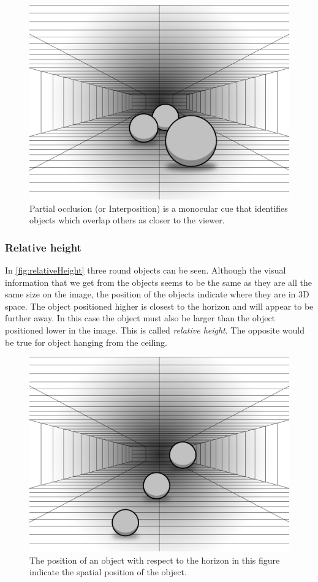 \begin{figure}[H]
	\centering
	\includegraphics[width=0.75\linewidth]{figure/Analysis/partialOcclusion.png}
	\caption{Partial occlusion (or Interposition) is a monocular cue that identifies objects which overlap others as closer to the viewer.}
	\label{fig:partialOcclusion}
\end{figure}

\subsubsection{Relative height}\label{sec:relativeHeight}
In \autoref{fig:relativeHeight} three round objects can be seen. Although the visual information that we get from the objects seems to be the same as they are all the same size on the image, the position of the objects indicate where they are in 3D space. The object positioned higher is closest to the horizon and will appear to be further away. In this case the object must also be larger than the object positioned lower in the image. This is called \textit{relative height}. The opposite would be true for object hanging from the ceiling\citep[p.~198]{sensationPerception}.

\begin{figure}[H]
	\centering
	\includegraphics[width=0.75\linewidth]{figure/Analysis/relativeHeight.png}
	\caption{The position of an object with respect to the horizon in this figure indicate the spatial position of the object.}
	\label{fig:relativeHeight}
\end{figure}

